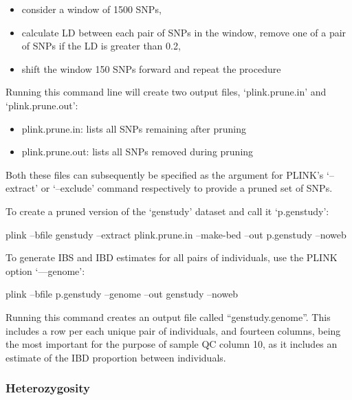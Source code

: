 \documentclass[]{book}
\newenvironment{Shaded}{\begin{snugshade}}{\end{snugshade}}
\newcommand{\ExtensionTok}[1]{#1}
\newcommand{\NormalTok}[1]{#1}
\providecommand{\tightlist}{%
  \setlength{\itemsep}{0pt}\setlength{\parskip}{0pt}}
\begin{document}
\begin{itemize}
\tightlist
\item
  consider a window of 1500 SNPs,
\item
  calculate LD between each pair of SNPs in the window, remove one of a
  pair of SNPs if the LD is greater than 0.2,
\item
  shift the window 150 SNPs forward and repeat the procedure
\end{itemize}

Running this command line will create two output files, `plink.prune.in'
and `plink.prune.out':

\begin{itemize}
\tightlist
\item
  plink.prune.in: lists all SNPs remaining after pruning
\item
  plink.prune.out: lists all SNPs removed during pruning
\end{itemize}

Both these files can subsequently be specified as the argument for
PLINK's `--extract' or `--exclude' command respectively to provide a
pruned set of SNPs.

To create a pruned version of the `genstudy' dataset and call it
`p.genstudy':

\begin{Shaded}
\begin{Highlighting}[]
\ExtensionTok{plink}\NormalTok{ --bfile genstudy --extract plink.prune.in --make-bed --out p.genstudy --noweb}
\end{Highlighting}
\end{Shaded}

To generate IBS and IBD estimates for all pairs of individuals, use the
PLINK option `---genome':

\begin{Shaded}
\begin{Highlighting}[]
\ExtensionTok{plink}\NormalTok{ --bfile p.genstudy --genome --out genstudy --noweb}
\end{Highlighting}
\end{Shaded}

Running this command creates an output file called ``genstudy.genome''.
This includes a row per each unique pair of individuals, and fourteen
columns, being the most important for the purpose of sample QC column
10, as it includes an estimate of the IBD proportion between
individuals.

\subsubsection{Heterozygosity}\label{heterozygosity}
\end{document}
